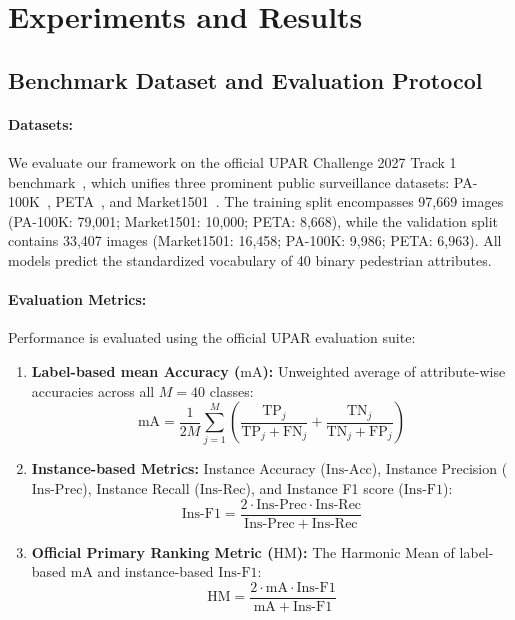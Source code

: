 \section{Experiments and Results}
\label{sec:experiments}

\subsection{Benchmark Dataset and Evaluation Protocol}
\paragraph{Datasets:} We evaluate our framework on the official UPAR Challenge 2027 Track 1 benchmark~\cite{specker2023upar}, which unifies three prominent public surveillance datasets: PA-100K~\cite{liu2017hydraplus}, PETA~\cite{deng2014pedestrian}, and Market1501~\cite{zheng2015scalable}. The training split encompasses 97,669 images (PA-100K: 79,001; Market1501: 10,000; PETA: 8,668), while the validation split contains 33,407 images (Market1501: 16,458; PA-100K: 9,986; PETA: 6,963). All models predict the standardized vocabulary of 40 binary pedestrian attributes.

\paragraph{Evaluation Metrics:} Performance is evaluated using the official UPAR evaluation suite:
\begin{enumerate}
    \item \textbf{Label-based mean Accuracy ($\text{mA}$):} Unweighted average of attribute-wise accuracies across all $M=40$ classes:
    \begin{equation}
        \mathrm{mA} = \frac{1}{2M} \sum_{j=1}^M \left( \frac{\mathrm{TP}_j}{\mathrm{TP}_j + \mathrm{FN}_j} + \frac{\mathrm{TN}_j}{\mathrm{TN}_j + \mathrm{FP}_j} \right)
    \end{equation}
    \item \textbf{Instance-based Metrics:} Instance Accuracy ($\mathrm{Ins}\text{-}\mathrm{Acc}$), Instance Precision ($\mathrm{Ins}\text{-}\mathrm{Prec}$), Instance Recall ($\mathrm{Ins}\text{-}\mathrm{Rec}$), and Instance F1 score ($\mathrm{Ins}\text{-}\mathrm{F1}$):
    \begin{equation}
        \mathrm{Ins}\text{-}\mathrm{F1} = \frac{2 \cdot \mathrm{Ins}\text{-}\mathrm{Prec} \cdot \mathrm{Ins}\text{-}\mathrm{Rec}}{\mathrm{Ins}\text{-}\mathrm{Prec} + \mathrm{Ins}\text{-}\mathrm{Rec}}
    \end{equation}
    \item \textbf{Official Primary Ranking Metric ($\text{HM}$):} The Harmonic Mean of label-based $\mathrm{mA}$ and instance-based $\mathrm{Ins}\text{-}\mathrm{F1}$:
    \begin{equation}
        \mathrm{HM} = \frac{2 \cdot \mathrm{mA} \cdot \mathrm{Ins}\text{-}\mathrm{F1}}{\mathrm{mA} + \mathrm{Ins}\text{-}\mathrm{F1}}
    \end{equation}
\end{enumerate}


